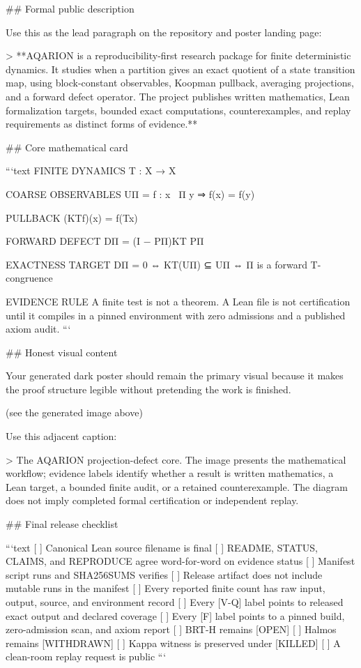 ## Formal public description

Use this as the lead paragraph on the repository and poster landing page:

> **AQARION is a reproducibility-first research package for finite deterministic dynamics. It studies when a partition gives an exact quotient of a state transition map, using block-constant observables, Koopman pullback, averaging projections, and a forward defect operator. The project publishes written mathematics, Lean formalization targets, bounded exact computations, counterexamples, and replay requirements as distinct forms of evidence.**

## Core mathematical card

```text
FINITE DYNAMICS
T : X → X

COARSE OBSERVABLES
UΠ = { f : x ~Π y ⇒ f(x) = f(y) }

PULLBACK
(KTf)(x) = f(Tx)

FORWARD DEFECT
DΠ = (I − PΠ)KT PΠ

EXACTNESS TARGET
DΠ = 0
⇔ KT(UΠ) ⊆ UΠ
⇔ Π is a forward T-congruence

EVIDENCE RULE
A finite test is not a theorem.
A Lean file is not certification until it compiles
in a pinned environment with zero admissions and
a published axiom audit.
```

## Honest visual content

Your generated dark poster should remain the primary visual because it makes the proof structure legible without pretending the work is finished.

(see the generated image above)

Use this adjacent caption:

> The AQARION projection-defect core. The image presents the mathematical workflow; evidence labels identify whether a result is written mathematics, a Lean target, a bounded finite audit, or a retained counterexample. The diagram does not imply completed formal certification or independent replay.

## Final release checklist

```text
[ ] Canonical Lean source filename is final
[ ] README, STATUS, CLAIMS, and REPRODUCE agree word-for-word on evidence status
[ ] Manifest script runs and SHA256SUMS verifies
[ ] Release artifact does not include mutable runs in the manifest
[ ] Every reported finite count has raw input, output, source, and environment record
[ ] Every [V-Q] label points to released exact output and declared coverage
[ ] Every [F] label points to a pinned build, zero-admission scan, and axiom report
[ ] BRT-H remains [OPEN]
[ ] Halmos remains [WITHDRAWN]
[ ] Kappa witness is preserved under [KILLED]
[ ] A clean-room replay request is public
```

